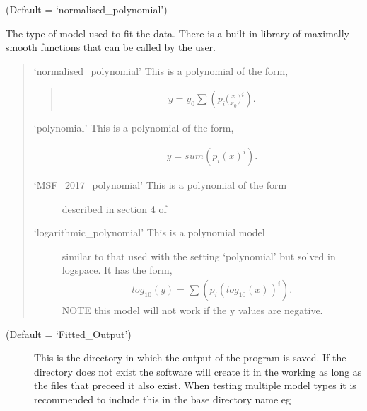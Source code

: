 \documentclass[letterpaper,10pt,english]{sphinxmanual}
\begin{document}
\begin{fulllineitems}
 (Default = ‘normalised\_polynomial’)

The type of model used to fit the data. There is a built in library of
maximally smooth functions that can be called by the user.

\begin{quote}

‘normalised\_polynomial’ \sphinxhyphen{} This is a polynomial of the form,
\begin{quote}
\begin{equation*}
\begin{split}{y=y_0 \sum (p_i\bigg(\frac{x}{x_0}\bigg)^i)}.\end{split}
\end{equation*}\end{quote}
\begin{description}
\item[{‘polynomial’ \sphinxhyphen{} This is a polynomial of the form,}] \leavevmode\begin{equation*}
\begin{split}{y=sum(p_i(x)^i)}.\end{split}
\end{equation*}
\item[{‘MSF\_2017\_polynomial’ \sphinxhyphen{} This is a polynomial of the form}] \leavevmode
described in section 4 of

\item[{‘logarithmic\_polynomial’ \sphinxhyphen{} This is a polynomial model}] \leavevmode
similar to that used with the setting ‘polynomial’ but
solved in log\sphinxhyphen{}space. It has the form,
\begin{equation*}
\begin{split}{log_{10}(y)=\sum(p_i(log_{10}(x))^i)}.\end{split}
\end{equation*}
NOTE this model will not work if the y values are negative.

\end{description}
\end{quote}
\begin{description}
\item[{ (Default = ‘Fitted\_Output’)}] \leavevmode
This is the directory in which the output of the program is saved. If
the directory does not exist the software will create it in the working
as long as the files that preceed it also exist. When testing multiple
model types it is recommended to include this in the base directory
name eg 


\end{description}
\end{fulllineitems}
\end{document}
